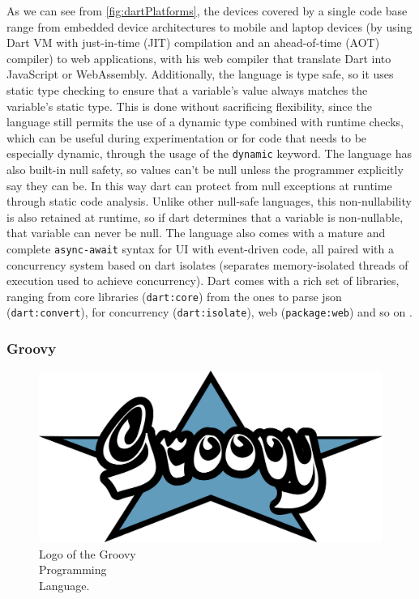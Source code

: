 \noindent As we can see from \cref{fig:dartPlatforms}, the devices covered by a single code base range from embedded device architectures to mobile and laptop devices (by using Dart VM with just-in-time (JIT) compilation and an ahead-of-time (AOT) compiler) to web applications, with his web compiler that translate Dart into JavaScript or WebAssembly. Additionally, the language is type safe, so it uses static type checking to ensure that a variable's value always matches the variable's static type. This is done without sacrificing flexibility, since the language still permits the use of a dynamic type combined with runtime checks, which can be useful during experimentation or for code that needs to be especially dynamic, through the usage of the \texttt{dynamic} keyword. The language has also built-in null safety, so values can't be null unless the programmer explicitly say they can be. In this way dart can protect from null exceptions at runtime through static code analysis. Unlike other null-safe languages, this non-nullability is also retained at runtime, so if dart determines that a variable is non-nullable, that variable can never be null. The language also comes with a mature and complete \texttt{async-await} syntax for UI with event-driven code, all paired with a concurrency system based on dart isolates (separates memory-isolated threads of execution used to achieve concurrency). Dart comes with a rich set of libraries, ranging from core libraries (\texttt{dart:core}) from the ones to parse json (\texttt{dart:convert}), for concurrency (\texttt{dart:isolate}), web (\texttt{package:web}) and so on \cite{Dart}.

\subsubsection{Groovy}

\begin{figure} %
    \captionsetup{font=footnotesize}
    \centering
    \includegraphics[width=\linewidth]{images/groovy.png}
    \caption{Logo of the Groovy\\Programming\\Language.}
\end{figure}

